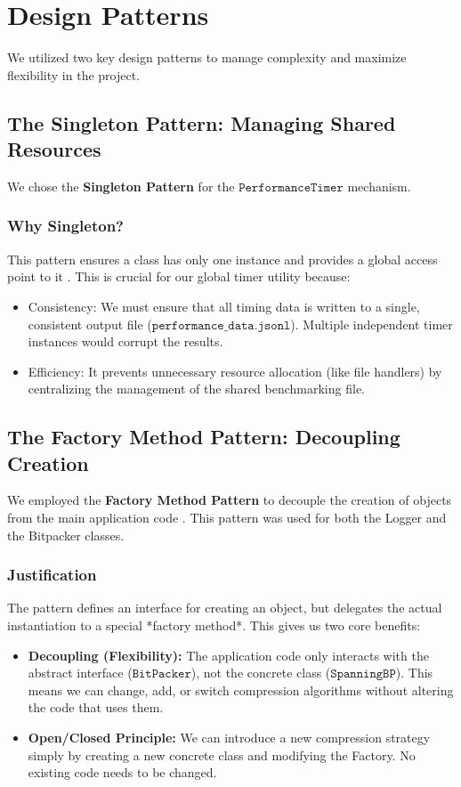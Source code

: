 \documentclass[11pt, a4paper]{article}
\begin{document}
	\section{Design Patterns}
	
	We utilized two key design patterns to manage complexity and maximize flexibility in the project.
	
	\subsection{The Singleton Pattern: Managing Shared Resources}
	\label{sec:singleton_pattern}
	
	We chose the \textbf{Singleton Pattern} for the $\texttt{PerformanceTimer}$ mechanism.
	
	\subsubsection*{Why Singleton?}
	This pattern ensures a class has only one instance and provides a global access point to it \cite{singleton}. This is crucial for our global timer utility because:
	\begin{itemize}
		\item Consistency: We must ensure that all timing data is written to a single, consistent output file ($\texttt{performance\_data.jsonl}$). Multiple independent timer instances would corrupt the results.
		\item Efficiency: It prevents unnecessary resource allocation (like file handlers) by centralizing the management of the shared benchmarking file.
	\end{itemize}
	
	\subsection{The Factory Method Pattern: Decoupling Creation}
	\label{sec:factory_method_pattern}
	
	We employed the \textbf{Factory Method Pattern} to decouple the creation of objects from the main application code \cite{factory}. This pattern was used for both the Logger and the Bitpacker classes.
	
	\subsubsection*{Justification}
	The pattern defines an interface for creating an object, but delegates the actual instantiation to a special *factory method*. This gives us two core benefits:
	\begin{itemize}
		\item \textbf{Decoupling (Flexibility):} The application code only interacts with the abstract interface ($\texttt{BitPacker}$), not the concrete class ($\texttt{SpanningBP}$). This means we can change, add, or switch compression algorithms without altering the code that uses them.
		\item \textbf{Open/Closed Principle:} We can introduce a new compression strategy simply by creating a new concrete class and modifying the Factory. No existing code needs to be changed.
	\end{itemize}
	
\end{document}
